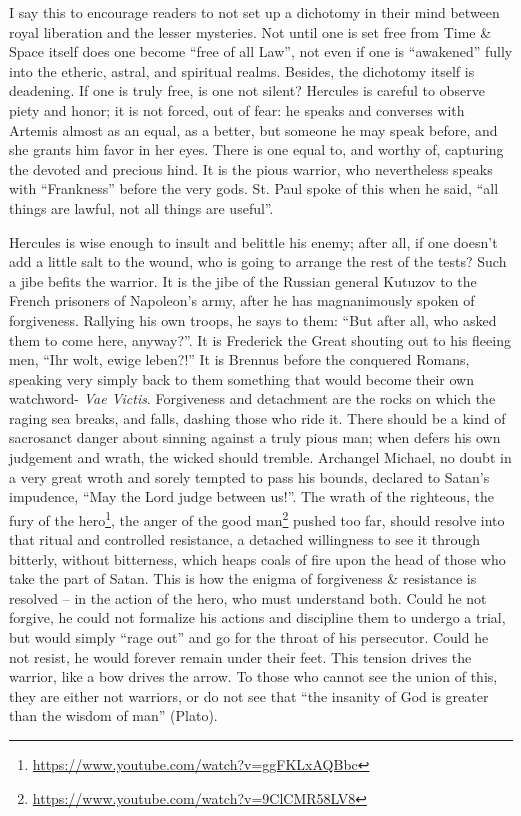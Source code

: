 I say this to encourage readers to not set up a dichotomy in their mind between royal liberation and the lesser mysteries. Not until one is set free from Time \& Space itself does one become ``free of all Law'', not even if one is ``awakened'' fully into the etheric, astral, and spiritual realms. Besides, the dichotomy itself is deadening. If one is truly free, is one not silent? Hercules is careful to observe piety and honor; it is not forced, out of fear: he speaks and converses with Artemis almost as an equal, as a better, but someone he may speak before, and she grants him favor in her eyes. There is one equal to, and worthy of, capturing the devoted and precious hind. It is the pious warrior, who nevertheless speaks with ``Frankness'' before the very gods. St. Paul spoke of this when he said, ``all things are lawful, not all things are useful''.

Hercules is wise enough to insult and belittle his enemy; after all, if one doesn't add a little salt to the wound, who is going to arrange the rest of the tests? Such a jibe befits the warrior. It is the jibe of the Russian general Kutuzov to the French prisoners of Napoleon's army, after he has magnanimously spoken of forgiveness. Rallying his own troops, he says to them: ``But after all, who asked them to come here, anyway?''. It is Frederick the Great shouting out to his fleeing men, ``Ihr wolt, ewige leben?!'' It is Brennus before the conquered Romans, speaking very simply back to them something that would become their own watchword- \emph{Vae Victis}. Forgiveness and detachment are the rocks on which the raging sea breaks, and falls, dashing those who ride it. There should be a kind of sacrosanct danger about sinning against a truly pious man; when defers his own judgement and wrath, the wicked should tremble. Archangel Michael, no doubt in a very great wroth and sorely tempted to pass his bounds, declared to Satan's impudence, ``May the Lord judge between us!''. The wrath of the righteous, the fury of the hero\footnote{\url{https://www.youtube.com/watch?v=ggFKLxAQBbc}}, the anger of the good man\footnote{\url{https://www.youtube.com/watch?v=9ClCMR58LV8}} pushed too far, should resolve into that ritual and controlled resistance, a detached willingness to see it through bitterly, without bitterness, which heaps coals of fire upon the head of those who take the part of Satan. This is how the enigma of forgiveness \& resistance is resolved -- in the action of the hero, who must understand both. Could he not forgive, he could not formalize his actions and discipline them to undergo a trial, but would simply ``rage out'' and go for the throat of his persecutor. Could he not resist, he would forever remain under their feet. This tension drives the warrior, like a bow drives the arrow. To those who cannot see the union of this, they are either not warriors, or do not see that ``the insanity of God is greater than the wisdom of man'' (Plato).

